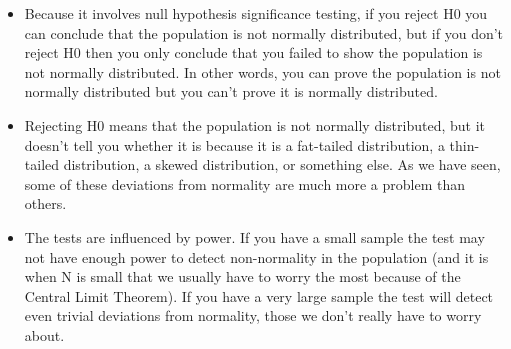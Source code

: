 \begin{itemize}
	\item Because it involves null hypothesis significance testing, if you reject H0 you can conclude that the population is not normally distributed, but if you don't reject H0 then you only conclude that you failed to show the population is not normally distributed. In other words, you can prove the population is not normally distributed but you can't prove it is normally distributed.
	
	\item Rejecting H0 means that the population is not normally distributed, but it doesn't tell you whether it is because it is a fat-tailed distribution, a thin-tailed distribution, a skewed distribution, or something else. As we have seen, some of these deviations from normality are much more a problem than others.
	
	\item The tests are influenced by power. If you have a small sample the test may not have enough power to detect non-normality in the population (and it is when N is small that we usually have to worry the most because of the Central Limit Theorem). If you have a very large sample the test will detect even trivial deviations from normality, those we don't really have to worry about.
\end{itemize}

